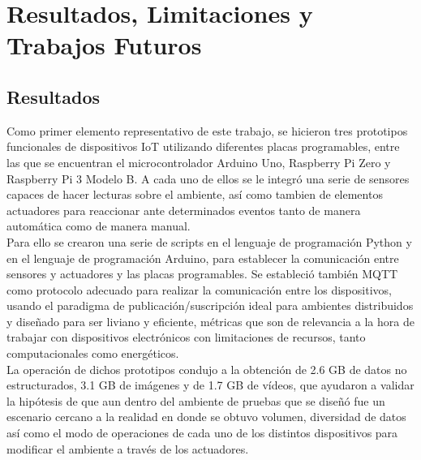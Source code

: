 

\chapter{Resultados, Limitaciones y Trabajos Futuros}

\section{Resultados}
Como primer elemento representativo de este trabajo, se hicieron tres prototipos funcionales de dispositivos IoT utilizando diferentes placas programables, entre las que se encuentran el microcontrolador Arduino Uno, Raspberry Pi Zero y Raspberry Pi 3 Modelo B. A cada uno de ellos se le integró una serie de sensores capaces de hacer lecturas sobre el ambiente, así como tambien de elementos actuadores para reaccionar ante determinados eventos tanto de manera automática como de manera manual.\\

Para ello se crearon una serie de scripts en el lenguaje de programación Python y en el lenguaje de programación Arduino, para establecer la comunicación entre sensores y actuadores y las placas programables.  Se estableció también MQTT como protocolo adecuado para realizar la comunicación entre los dispositivos, usando el paradigma de publicación/suscripción ideal para ambientes distribuidos y diseñado para ser liviano y eficiente, métricas que son de relevancia a la hora de trabajar con dispositivos electrónicos con limitaciones de recursos, tanto computacionales como energéticos.\\

La operación de dichos prototipos condujo a la obtención de 2.6 GB de datos no estructurados, 3.1 GB de imágenes y de 1.7 GB de vídeos, que ayudaron a validar la hipótesis de que aun dentro del ambiente de pruebas que se diseñó fue un escenario cercano a la realidad en donde se obtuvo volumen, diversidad de datos así como el modo de operaciones de cada uno de los distintos dispositivos para modificar el ambiente a través de los actuadores.\\

